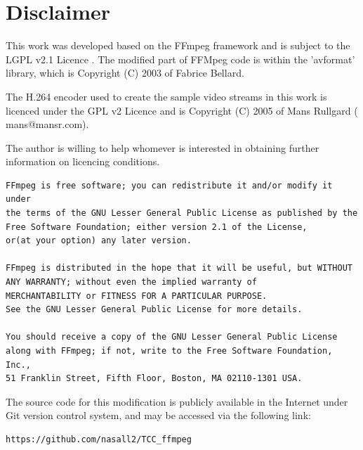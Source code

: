 \documentclass[
	12pt,				%
	openright,			%
	twoside,			%
	a4paper,			%
	brazil,
	french,				%
	english
	]{abntex2}
\begin{document}
\tableofcontents*
\cleardoublepage



\textual

\chapter*[Disclaimer]{Disclaimer}

This work was developed based on the FFmpeg\cite{ffmpeg} framework and is subject to the LGPL v2.1 Licence \cite{gplv2}. The modified part of FFMpeg code is within the 'avformat' library, which is Copyright (C) 2003 of Fabrice Bellard. 

The H.264 encoder used to create the sample video streams in this work is licenced under the GPL v2 Licence and is Copyright (C) 2005 of Mans Rullgard ( mans@mansr.com).

The author is willing to help whomever is interested in obtaining further information on licencing conditions.

\begin{lstlisting}[]
FFmpeg is free software; you can redistribute it and/or modify it under
the terms of the GNU Lesser General Public License as published by the
Free Software Foundation; either version 2.1 of the License,
or(at your option) any later version.

FFmpeg is distributed in the hope that it will be useful, but WITHOUT
ANY WARRANTY; without even the implied warranty of
MERCHANTABILITY or FITNESS FOR A PARTICULAR PURPOSE.
See the GNU Lesser General Public License for more details.

You should receive a copy of the GNU Lesser General Public License
along with FFmpeg; if not, write to the Free Software Foundation, Inc.,
51 Franklin Street, Fifth Floor, Boston, MA 02110-1301 USA.
\end{lstlisting}

The source code for this modification is publicly available in the Internet under Git version control system, and may be accessed via the following link:
\begin{verbatim}
https://github.com/nasall2/TCC_ffmpeg
\end{verbatim}
 
\end{document}
